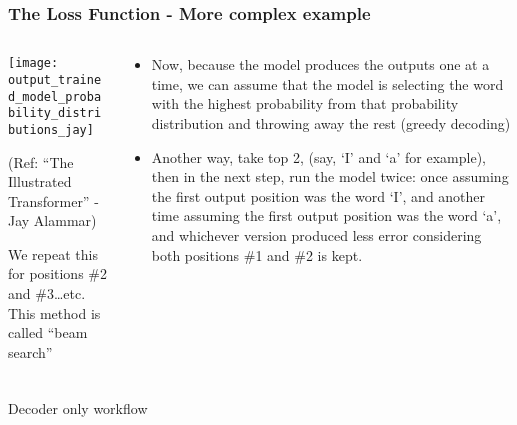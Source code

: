 \begin{frame}[fragile]\frametitle{The Loss Function - More complex example}

\begin{columns}
    \begin{column}[T]{0.5\linewidth}
\begin{center}
\texttt{[image: output\_trained\_model\_probability\_distributions\_jay]}


{\tiny (Ref: ``The Illustrated Transformer'' - Jay Alammar)}
\end{center}		

 We repeat this for positions \#2 and \#3…etc. This method is called “beam search”
		\end{column}
    \begin{column}[T]{0.5\linewidth}

\begin{itemize}
\item Now, because the model produces the outputs one at a time, we can assume that the model is selecting the word with the highest probability from that probability distribution and throwing away the rest (greedy decoding)
\item Another way, take top 2, (say, ‘I’ and ‘a’ for example), then in the next step, run the model twice: once assuming the first output position was the word ‘I’, and another time assuming the first output position was the word ‘a’, and whichever version produced less error considering both positions \#1 and \#2 is kept.
\end{itemize}
    \end{column}
  \end{columns}	

\end{frame}



\begin{frame}[fragile]\frametitle{}
\begin{center}
{\Large Decoder only workflow}
\end{center}
\end{frame}
